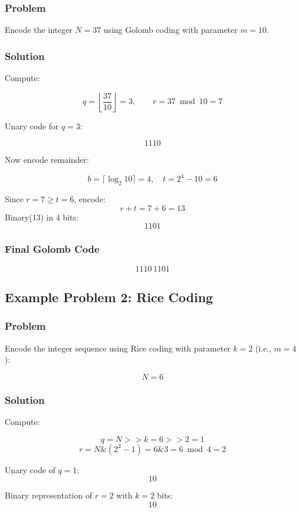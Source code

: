 \documentclass{AnantDocumentation}
\begin{document}
\subsubsection*{Problem}

Encode the integer \(N = 37\) using Golomb coding with parameter \(m = 10\).

\subsubsection*{Solution}

Compute:

\[
q = \left\lfloor \frac{37}{10} \right\rfloor = 3,\qquad r = 37 \bmod 10 = 7
\]

Unary code for \(q=3\):

\[
1110
\]

Now encode remainder:

\[
b = \lceil \log_2 10 \rceil = 4,\quad t = 2^4 - 10 = 6
\]

Since \(r = 7 \ge t = 6\), encode:
\[
r + t = 7 + 6 = 13
\]
Binary(13) in 4 bits:
\[
1101
\]

\subsubsection*{Final Golomb Code}

\[
\boxed{1110\,1101}
\]

\subsection{Example Problem 2: Rice Coding}

\subsubsection*{Problem}

Encode the integer sequence using Rice coding with parameter \(k = 2\) (i.e., \(m = 4\)):

\[
N = 6
\]

\subsubsection*{Solution}

Compute:

\[
q = N >> k = 6 >> 2 = 1
\]
\[
r = N \& (2^2 - 1) = 6 \& 3 = 6 \bmod 4 = 2
\]

Unary code of \(q=1\):
\[
10
\]

Binary representation of \(r = 2\) with \(k=2\) bits:
\[
10
\]
\end{document}
